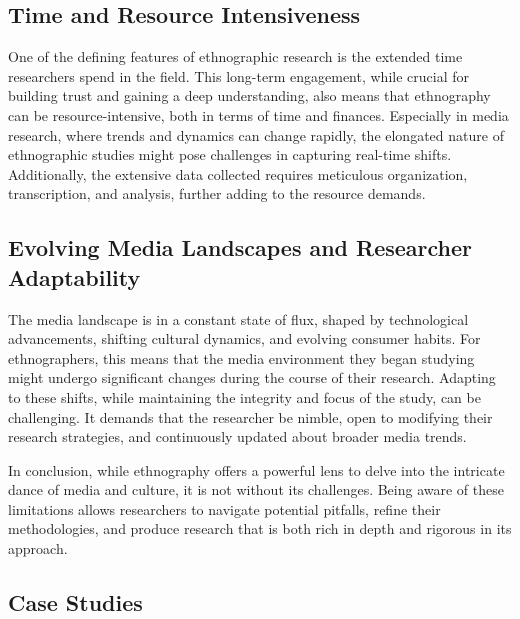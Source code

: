 \documentclass[
  b5paper]{book}
\begin{document}
\hypertarget{time-and-resource-intensiveness}{%
\subsection*{Time and Resource Intensiveness}\label{time-and-resource-intensiveness}}

One of the defining features of ethnographic research is the extended time researchers spend in the field. This long-term engagement, while crucial for building trust and gaining a deep understanding, also means that ethnography can be resource-intensive, both in terms of time and finances. Especially in media research, where trends and dynamics can change rapidly, the elongated nature of ethnographic studies might pose challenges in capturing real-time shifts. Additionally, the extensive data collected requires meticulous organization, transcription, and analysis, further adding to the resource demands.

\hypertarget{evolving-media-landscapes-and-researcher-adaptability}{%
\subsection*{Evolving Media Landscapes and Researcher Adaptability}\label{evolving-media-landscapes-and-researcher-adaptability}}

The media landscape is in a constant state of flux, shaped by technological advancements, shifting cultural dynamics, and evolving consumer habits. For ethnographers, this means that the media environment they began studying might undergo significant changes during the course of their research. Adapting to these shifts, while maintaining the integrity and focus of the study, can be challenging. It demands that the researcher be nimble, open to modifying their research strategies, and continuously updated about broader media trends.

In conclusion, while ethnography offers a powerful lens to delve into the intricate dance of media and culture, it is not without its challenges. Being aware of these limitations allows researchers to navigate potential pitfalls, refine their methodologies, and produce research that is both rich in depth and rigorous in its approach.

\hypertarget{case-studies-1}{%
\subsection*{Case Studies}\label{case-studies-1}}
\end{document}

